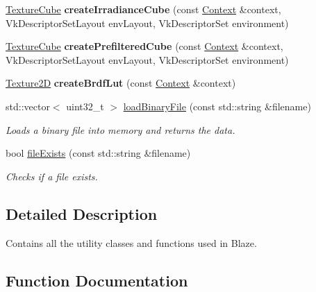 \begin{DoxyCompactItemize}
\hyperlink{classblaze_1_1TextureCube}{Texture\+Cube} {\bfseries create\+Irradiance\+Cube} (const \hyperlink{classblaze_1_1Context}{Context} \&context, Vk\+Descriptor\+Set\+Layout env\+Layout, Vk\+Descriptor\+Set environment)
\item 
\mbox{\label{namespaceblaze_1_1util_a9390345ac842e0f40ee51b78fb42ba21}} 
\hyperlink{classblaze_1_1TextureCube}{Texture\+Cube} {\bfseries create\+Prefiltered\+Cube} (const \hyperlink{classblaze_1_1Context}{Context} \&context, Vk\+Descriptor\+Set\+Layout env\+Layout, Vk\+Descriptor\+Set environment)
\item 
\mbox{\label{namespaceblaze_1_1util_a40178769f61c84588316821b38ea0a48}} 
\hyperlink{classblaze_1_1Texture2D}{Texture2D} {\bfseries create\+Brdf\+Lut} (const \hyperlink{classblaze_1_1Context}{Context} \&context)
\item 
std\+::vector$<$ uint32\+\_\+t $>$ \hyperlink{namespaceblaze_1_1util_a0157eaabde62d86926906bb797d7ada8}{load\+Binary\+File} (const std\+::string \&filename)
\begin{DoxyCompactList}\small\item\em Loads a binary file into memory and returns the data. \end{DoxyCompactList}\item 
bool \hyperlink{namespaceblaze_1_1util_a33c7b989ef9f0b2f56ca8632cd6784c5}{file\+Exists} (const std\+::string \&filename)
\begin{DoxyCompactList}\small\item\em Checks if a file exists. \end{DoxyCompactList}\end{DoxyCompactItemize}


\subsection{Detailed Description}
Contains all the utility classes and functions used in Blaze. 

\subsection{Function Documentation}
\mbox{\label{namespaceblaze_1_1util_aba6d1d4fa38d54444eb861c08919af34}} 

